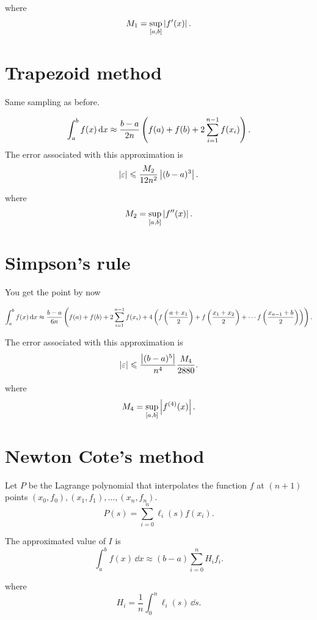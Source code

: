 \documentclass{report}
\begin{document}
where
\[
	M_1 = \sup_{[a,b]}\left|f'(x)\right|
	.\]

\section{Trapezoid method}

Same sampling as before.

\[
	\int_a^b f(x)\,\mathrm{d}x \approx \frac{b-a}{2n}\left(f(a)+f(b)+2\sum_{i=1}^{n-1}f(x_i)\right)
	.\]
The error associated with this approximation is
\[
	|\varepsilon|\leqslant \frac{M_2}{12n^2}\left|(b-a)^3\right|
	.\]

where
\[
	M_2 = \sup_{[a,b]}\left|f''(x)\right|
	.\]

\section{Simpson's rule}

You get the point by now

\[
	\int_a^b f(x)\,\mathrm{d}x \approx \frac{b-a}{6n}\left(f(a)+f(b)+2\sum_{i=1}^{n-1}f(x_i) + 4\left(
	f\left(\frac{a+x_1}{2}\right) +
	f\left(\frac{x_1+x_2}{2}\right) +
	\cdots
	f\left(\frac{x_{n-1}+b}{2}\right)
	\right)
	\right)
	.\]

The error associated with this approximation is
\[
	|\varepsilon|\leqslant \frac{\left|(b-a)^5\right|}{n^4}\frac{M_4}{2880}
	.\]

where
\[
	M_4 = \sup_{[a,b]}\left|f^{(4)}(x)\right|
	.\]


\section{Newton Cote's method}

Let $P$ be the Lagrange polynomial that interpolates the function $f$ at $(n+1)$ points $(x_0,f_0),(x_1,f_1),\dots,(x_n,f_n)$.
\[
	P(s) = \sum_{i=0}^{n}\ell_i(s)f(x_i)
	.\]

The approximated value of $I$ is
\[
	\int_a^b f(x)\,\dd{x} \approx (b-a)\sum_{i=0}^n H_i f_i
	.\]

where
\[
	H_i = \frac{1}{n}\int_0^n \ell_i(s)\,\dd{s}
	.\]
\end{document}
